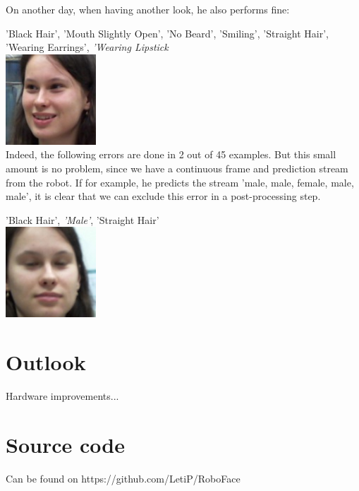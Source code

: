\documentclass[12.5pt]{scrartcl}
\begin{document}
	On another day, when having another look, he also performs fine:
	
	'Black Hair', 'Mouth Slightly Open', 'No Beard', 'Smiling', 'Straight Hair', 'Wearing Earrings', \emph{'Wearing Lipstick}
	 \\
	\includegraphics[height=0.1\textheight]{images/leti_normalised24}\\
	
	Indeed, the following errors are done in 2 out of 45 examples. But this small amount is no problem, since we have a continuous frame and prediction stream from the robot. If for example, he predicts the stream 'male, male, female, male, male', it is clear that we can exclude this error in a post-processing step.
	
	'Black Hair', \emph{'Male'}, 'Straight Hair'\\
	\includegraphics[height=0.1\textheight]{images/leti_normalised0}
	\section{Outlook}
	Hardware improvements...
	\section{Source code}
	Can be found on	https://github.com/LetiP/RoboFace
	
\end{document}
